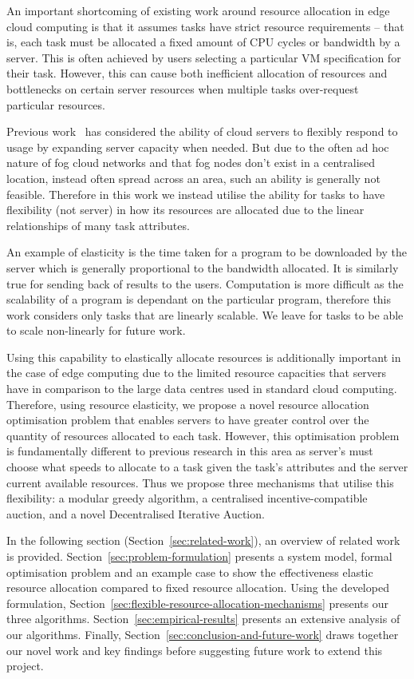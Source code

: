 An important shortcoming of existing work around resource allocation in edge cloud computing is that it assumes tasks
have strict resource requirements -- that is, each task must be allocated a fixed amount of CPU cycles or bandwidth by a
server. This is often achieved by users selecting a particular VM specification for their task. However, this can cause
both inefficient allocation of resources and bottlenecks on certain server resources when multiple tasks over-request
particular resources.

Previous work~\cite{ServerElasticity} has considered the ability of cloud servers to flexibly respond to usage by
expanding server capacity when needed. But due to the often ad hoc nature of fog cloud networks and that fog nodes don't
exist in a centralised location, instead often spread across an area, such an ability is generally not feasible. Therefore in
this work we instead utilise the ability for tasks to have flexibility (not server) in how its resources are allocated
due to the linear relationships of many task attributes.

An example of elasticity is the time taken for a program to be downloaded by the server which is generally proportional
to the bandwidth allocated. It is similarly true for sending back of results to the users. Computation is more
difficult as the scalability of a program is dependant on the particular program, therefore this
work considers only tasks that are linearly scalable. We leave for tasks to be able to scale non-linearly for future
work.

Using this capability to elastically allocate resources is additionally important in the case of edge computing due to
the limited resource capacities that servers have in comparison to the large data centres used in standard cloud
computing. Therefore, using resource elasticity, we propose a novel resource allocation optimisation problem that
enables servers to have greater control over the quantity of resources allocated to each task. However, this optimisation problem is
fundamentally different to previous research in this area as server's must choose what speeds to allocate to a task
given the task's attributes and the server current available resources. Thus we propose three mechanisms that utilise
this flexibility: a modular greedy algorithm, a centralised incentive-compatible auction, and a novel Decentralised
Iterative Auction.

In the following section (Section~\ref{sec:related-work}), an overview of related work is provided.
Section~\ref{sec:problem-formulation} presents a system model, formal optimisation problem and an example
case to show the effectiveness elastic resource allocation compared to fixed resource allocation. Using the developed
formulation, Section~\ref{sec:flexible-resource-allocation-mechanisms} presents our three algorithms.
Section~\ref{sec:empirical-results} presents an extensive analysis of our algorithms. Finally,
Section~\ref{sec:conclusion-and-future-work} draws together our novel work and key findings before suggesting 
future work to extend this project. 
